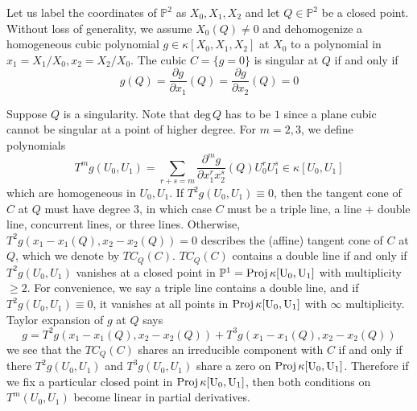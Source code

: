 \documentclass[12pt]{article}
\theoremstyle{plain}
\theoremstyle{definition}
\newcommand{\IA}{\mathbb{A}}
\newcommand{\IP}{\mathbb{P}}
\newcommand{\sT}{\mathcal{T}}
\renewcommand{\deg}{\mathrm{deg}\,}
\newcommand{\Proj}{\rm Proj\,}
\newcommand{\<}{\langle}
\renewcommand{\>}{\rangle}
\newcommand{\p}{\partial}
\begin{document}
Let us label the coordinates of $\IP^2$ as $X_0, X_1, X_2$ and let $Q \in \IP^2$ be a closed point. Without loss of generality, we assume $X_0(Q) \neq 0$ and dehomogenize a homogeneous cubic polynomial $g \in \kappa[X_0, X_1, X_2]$ at $X_0$ to a polynomial in $x_1 = X_1/X_0, x_2 = X_2/X_0$. The cubic $C = \{g = 0\}$ is singular at $Q$ if and only if 
$$ g(Q) = \frac{\p g}{\p x_1} (Q) = \frac{\p g}{\p x_2}(Q) = 0$$

Suppose $Q$ is a singularity. Note that $\deg Q$ has to be $1$ since a plane cubic cannot be singular at a point of higher degree. %
For $m = 2, 3$, we define polynomials 
$$ T^m g(U_0, U_1) = \sum_{r + s = m} \frac{\p^m g}{\p x_1^r x_2^s}(Q) U_0^r U_1^s \in \kappa[U_0, U_1]$$
which are homogeneous in $U_0, U_1$. If $T^2 g(U_0, U_1) \equiv 0$, then the tangent cone of $C$ at $Q$ must have degree $3$, in which case $C$ must be a triple line, a line + double line, concurrent lines, or three lines. Otherwise, $T^2 g(x_1 - x_1(Q), x_2 - x_2(Q)) = 0$ describes the (affine) tangent cone of $C$ at $Q$, which we denote by $TC_Q(C)$. $TC_Q(C)$ contains a double line if and only if $T^2 g(U_0, U_1)$ vanishes at a closed point in $\IP^1 = \Proj \kappa[U_0, U_1]$ with multiplicity $\ge 2$. For convenience, we say a triple line contains a double line, and if $T^2 g(U_0, U_1) \equiv 0$, it vanishes at all points in $\Proj \kappa[U_0, U_1]$ with $\infty$ multiplicity. Taylor expansion of $g$ at $Q$ says
$$ g = T^2 g(x_1 - x_1(Q), x_2 - x_2(Q)) + T^3 g(x_1 - x_1(Q), x_2 - x_2(Q)) $$
we see that the $TC_Q(C)$ shares an irreducible component with $C$ if and only if there $T^2 g(U_0, U_1)$ and $T^3 g(U_0, U_1)$ share a zero on $\Proj \kappa[U_0, U_1]$. Therefore if we fix a particular closed point in $\Proj \kappa[U_0, U_1]$, then both conditions on $T^m(U_0, U_1)$ become linear in partial derivatives.
\end{document}
